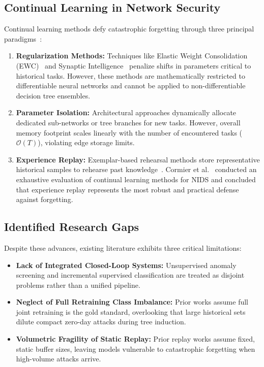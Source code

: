 \documentclass[conference]{IEEEtran}
\begin{document}
\subsection{Continual Learning in Network Security}
Continual learning methods defy catastrophic forgetting through three principal paradigms~\cite{de2021continual}:
\begin{enumerate}
    \item \textbf{Regularization Methods:} Techniques like Elastic Weight Consolidation (EWC)~\cite{kirkpatrick2017overcoming} and Synaptic Intelligence~\cite{zenke2017continual} penalize shifts in parameters critical to historical tasks. However, these methods are mathematically restricted to differentiable neural networks and cannot be applied to non-differentiable decision tree ensembles.
    \item \textbf{Parameter Isolation:} Architectural approaches dynamically allocate dedicated sub-networks or tree branches for new tasks. However, overall memory footprint scales linearly with the number of encountered tasks ($\mathcal{O}(T)$), violating edge storage limits.
    \item \textbf{Experience Replay:} Exemplar-based rehearsal methods store representative historical samples to rehearse past knowledge~\cite{rebuffi2017icarl,chaudhry2019tiny}. Cormier et al.~\cite{replay_or_regret2023} conducted an exhaustive evaluation of continual learning methods for NIDS and concluded that experience replay represents the most robust and practical defense against forgetting.
\end{enumerate}

\subsection{Identified Research Gaps}
Despite these advances, existing literature exhibits three critical limitations:
\begin{itemize}
    \item \textbf{Lack of Integrated Closed-Loop Systems:} Unsupervised anomaly screening and incremental supervised classification are treated as disjoint problems rather than a unified pipeline.
    \item \textbf{Neglect of Full Retraining Class Imbalance:} Prior works assume full joint retraining is the gold standard, overlooking that large historical sets dilute compact zero-day attacks during tree induction.
    \item \textbf{Volumetric Fragility of Static Replay:} Prior replay works assume fixed, static buffer sizes, leaving models vulnerable to catastrophic forgetting when high-volume attacks arrive.
\end{itemize}
\end{document}
